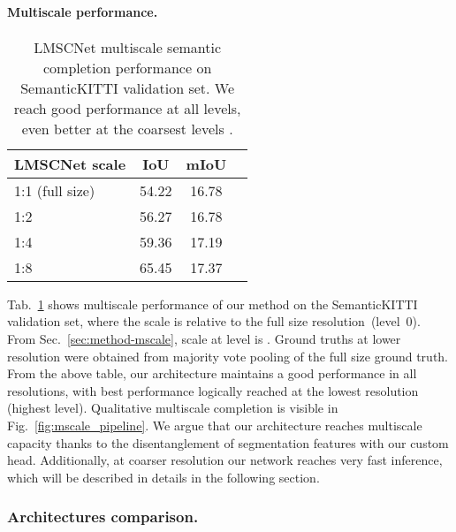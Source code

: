 \paragraph{Multiscale performance.}
\begin{table}
		\setlength{\tabcolsep}{0.0038\linewidth}
		\centering
		\footnotesize
		\begin{tabular}{lccc}
			\toprule
			LMSCNet scale & IoU & mIoU  \\
			\midrule
			1:1 (full size) & 54.22 & 16.78 \\
			1:2 & 56.27 & 16.78 \\
			1:4 & 59.36 & 17.19 \\
			1:8 & 65.45 & 17.37 \\
			\bottomrule
	\end{tabular}
	\caption{LMSCNet multiscale semantic completion performance on SemanticKITTI validation set. We reach good performance at all levels, even better at the coarsest levels .\vspace{-0.5 cm}}
	\label{table:multiscale}
\end{table}
Tab.~\ref{table:multiscale} shows multiscale performance of our method on the SemanticKITTI validation set, where the scale is relative to the full size resolution~(level~0). From Sec.~\ref{sec:method-mscale}, scale at level  is . Ground truths at lower resolution were obtained from majority vote pooling of the full size ground truth.
From the above table, our architecture maintains a good performance in all resolutions, with best performance logically reached at the lowest resolution (highest level). 
Qualitative multiscale completion is visible in Fig.~\ref{fig:mscale_pipeline}.
We argue that our architecture reaches multiscale capacity thanks to the disentanglement of segmentation features with our custom head. Additionally, at coarser resolution our network reaches very fast inference, which will be described in details in the following section.


\subsubsection{Architectures comparison.}\label{sec:exp-perf-arch}


